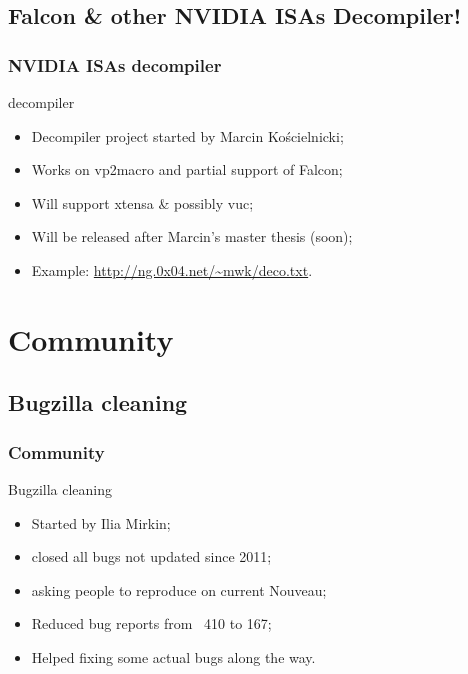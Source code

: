 \documentclass[11pt,english,compress]{beamer}
\begin{document}
\subsection{Falcon \& other NVIDIA ISAs Decompiler!}
\begin{frame}
	\frametitle{NVIDIA ISAs decompiler}

	\begin{block}{decompiler}
		\begin{itemize}
			\item Decompiler project started by Marcin Kościelnicki;
			\item Works on vp2macro and partial support of Falcon;
			\item Will support xtensa \& possibly vuc;
			\item Will be released after Marcin's master thesis
(soon);
			\item Example: \url{http://ng.0x04.net/~mwk/deco.txt}.
		\end{itemize}
	\end{block}
\end{frame}

\section{Community}

\subsection{Bugzilla cleaning}
\begin{frame}
	\frametitle{Community}

	\begin{block}{Bugzilla cleaning}
		\begin{itemize}
			\item Started by Ilia Mirkin;
			\item closed all bugs not updated since 2011;
			\item asking people to reproduce on current Nouveau;
			\item Reduced bug reports from ~410 to 167;
			\item Helped fixing some actual bugs along the way.
		\end{itemize}
	\end{block}
\end{frame}
\end{document}
